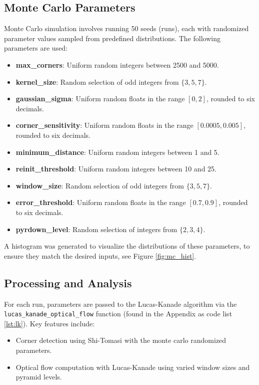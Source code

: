 \documentclass[11pt, conference, letterpaper]{IEEEtran}
\begin{document}
\subsection{Monte Carlo Parameters}

Monte Carlo simulation involves running 50 seeds (runs), each with randomized parameter values sampled from predefined distributions. The following parameters are used:
\begin{itemize}
    \item \textbf{max\_corners}: Uniform random integers between 2500 and 5000.
    \item \textbf{kernel\_size}: Random selection of odd integers from $\{3, 5, 7\}$.
    \item \textbf{gaussian\_sigma}: Uniform random floats in the range $[0, 2]$, rounded to six decimals.
    \item \textbf{corner\_sensitivity}: Uniform random floats in the range $[0.0005, 0.005]$, rounded to six decimals.
    \item \textbf{minimum\_distance}: Uniform random integers between 1 and 5.
    \item \textbf{reinit\_threshold}: Uniform random integers between 10 and 25.
    \item \textbf{window\_size}: Random selection of odd integers from $\{3, 5, 7\}$.
    \item \textbf{error\_threshold}: Uniform random floats in the range $[0.7, 0.9]$, rounded to six decimals.
    \item \textbf{pyrdown\_level}: Random selection of integers from $\{2, 3, 4\}$.
\end{itemize}

A histogram was generated to visualize the distributions of these parameters, to ensure they match the desired inputs, see Figure \ref{fig:mc_hist}.

\subsection{Processing and Analysis}

For each run, parameters are passed to the Lucas-Kanade algorithm via the \texttt{lucas\_kanade\_optical\_flow} function (found in the Appendix as code list \ref{lst:lk}). Key features include:
\begin{itemize}
    \item Corner detection using Shi-Tomasi with the monte carlo randomized parameters.
    \item Optical flow computation with Lucas-Kanade using varied window sizes and pyramid levels.
\end{itemize}
\end{document}
